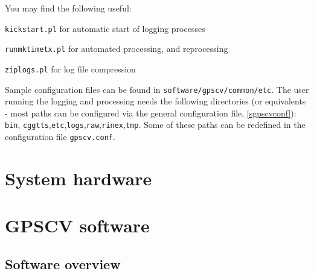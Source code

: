 \documentclass[11pt,a4paper,openany,oneside]{book}
\newcommand{\cc}[1]{{\texttt{#1}}}
\newenvironment{description*}%
  {\setlength{\parskip}{0pt}%
	 \begin{description}%
		\setlength{\topsep}{-12pt}%
		\setlength{\itemindent}{-12pt}%
    \setlength{\itemsep}{0pt}%
		\setlength{\itemsep}{0pt}}%
  {\end{description}}
\begin{document}
You may find the following useful:
\begin{description*}
	\item[] \cc{kickstart.pl} for automatic start of logging processes
	\item[] \cc{runmktimetx.pl} for automated processing, and reprocessing
	\item[] \cc{ziplogs.pl} for log file compression
\end{description*}	

Sample configuration files can be found in \cc{software/gpscv/common/etc}.
The user running the logging and processing needs the following directories (or equivalents - most paths
can be configured via the general configuration file, \ref{sgpscvconf}):
\cc{bin}, \cc{cggtts},\cc{etc},\cc{logs},\cc{raw},\cc{rinex},\cc{tmp}. Some of these paths can
be redefined in the configuration file \cc{gpscv.conf}.


\chapter{System hardware}




\chapter{GPSCV software}

\section{Software overview}
\end{document}
